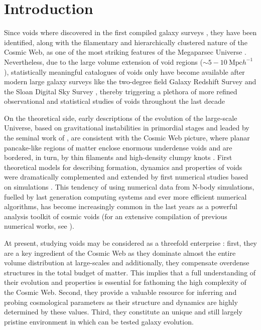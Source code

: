 \documentclass[a4,useAMS,usenatbib,usegraphicx]{latex/mn2e}
\begin{document}
\section{Introduction}
\label{sec:introduction}


Since voids where discovered in the first compiled galaxy surveys 
\citep{Chincarini75, Gregory78, Einasto80M, Einasto80N, Kirshner81, 
Kirshner87}, they have been identified, along with the filamentary and 
hierarchically clustered nature of the Cosmic Web, as one of the most 
striking features of the Megaparsec Universe \citep{Bond96}. Nevertheless,
due to the large volume extension of void regions ($\sim 5-10\ \mbox{Mpc} 
h^{-1}$), statistically meaningful catalogues of voids \citep{Pan10, 
Sutter12b, Nadathur14} only have become available after modern large 
galaxy surveys like the two-degree field Galaxy Redshift Survey \citep{
Colless01, Colless03} and the Sloan Digital Sky Survey \citep{York00,
Abazajian03}, thereby triggering a plethora of more refined observational 
and statistical studies of voids throughout the last decade \citep{Hoyle04,
Croton04, Rojas05, Ceccarelli06, Patiri06a, Tikhonov06, Patiri06b, 
Tikhonov07, BendaBeckmann08, Foster09, Ceccarelli13, Sutter14a}


On the theoretical side, early descriptions of the evolution of the 
large-scale Universe, based on gravitational instabilities in primordial 
stages and leaded by the seminal work of \citet{Zeldovich70}, are 
consistent with the Cosmic Web picture, where planar pancake-like regions 
of matter enclose enormous underdense voids and are bordered, in turn, by 
thin filaments and high-density clumpy knots \citep{Bond96}. First 
theoretical models for describing formation, dynamics and properties of 
voids \citep{Hoffman82, Icke84, Bertschinger85, Blumenthal92} were 
dramatically complemented and extended by first numerical studies based 
on simulations \citep{Martel90, Regos91, Weygaert93, Dubinski93}. This 
tendency of using numerical data from N-body simulations, fuelled by last 
generation computing systems and ever more efficient numerical algorithms, 
has become increasingly common in the last years as a powerful analysis 
toolkit of cosmic voids (for an extensive compilation of previous 
numerical works, see \citet{Colberg08}).


At present, studying voids may be considered as a threefold enterprise
\citep{Platen07}: first, they are a key ingredient of the Cosmic Web as 
they dominate almost the entire volume distribution at large-scales and 
additionally, they compensate overdense structures in the total budget of 
matter. This implies that a full understanding of their evolution and 
properties is essential for fathoming the high complexity of the Cosmic 
Web. Second, they provide a valuable resource for inferring and probing 
cosmological parameters as their structure and dynamics are highly 
determined by these values. Third, they constitute an unique and still 
largely pristine environment in which can be tested galaxy evolution.
\end{document}
